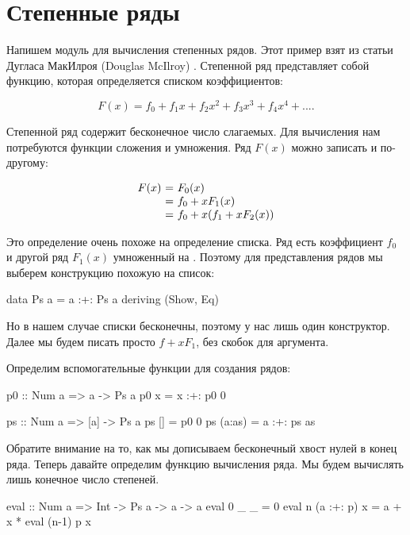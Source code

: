 \section{Степенные ряды}

Напишем модуль для вычисления степенных рядов.
Этот пример взят из статьи Дугласа МакИлроя 
(Douglas McIlroy) .
Степенной ряд представляет собой функцию, которая 
определяется списком коэффициентов:

\[ F(x) = f_0 + f_1 x + f_2 x^2 + f_3 x^3 + f_4 x^4 + .... \]

Степенной ряд содержит бесконечное число слагаемых.
Для вычисления  нам потребуются функции сложения
и умножения. Ряд $F(x)$ можно записать и по-другому:

\[\begin{array}{l@{\ =\ }l}
F(x) & F_0 (x) \\
     & f_0 + x F_1 (x)  \\
     & f_0 + x (f_1 + x F_2 (x)) \\   
\end{array}\]

Это определение очень похоже на определение списка. Ряд
есть коэффициент $f_0$ и другой ряд $F_1(x)$ умноженный
на . Поэтому для представления рядов мы выберем 
конструкцию похожую на список:


\begin{code}
data Ps a = a :+: Ps a
    deriving (Show, Eq)
\end{code}


Но в нашем случае списки бесконечны, поэтому у
нас лишь один конструктор.
Далее мы будем писать просто $f + x F_1$, без скобок для аргумента.


Определим вспомогательные функции для создания рядов:


\begin{code}
p0 :: Num a => a -> Ps a
p0 x = x :+: p0 0

ps :: Num a => [a] -> Ps a
ps []     = p0 0
ps (a:as) = a :+: ps as
\end{code}


Обратите внимание на то, как мы дописываем бесконечный хвост
нулей в конец ряда.
Теперь давайте определим функцию вычисления ряда. Мы будем
вычислять лишь конечное число степеней. 


\begin{code}
eval :: Num a => Int -> Ps a -> a -> a
eval 0 _         _ = 0
eval n (a :+: p) x = a + x * eval (n-1) p x
\end{code}

